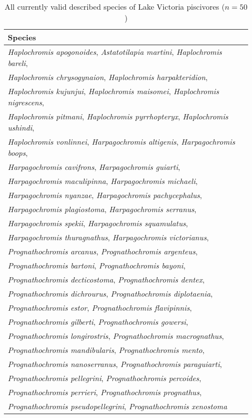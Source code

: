\begin{table}[]
\centering
\begin{tabular}{l}
\toprule 
\textbf{Species} \\ \midrule
\textit{Haplochromis apogonoides}, \textit{Astatotilapia martini}, \textit{Haplochromis bareli}, \\
\textit{Haplochromis chrysogynaion}, \textit{Haplochromis harpakteridion}, \\
\textit{Haplochromis kujunjui}, \textit{Haplochromis maisomei}, \textit{Haplochromis nigrescens}, \\
\textit{Haplochromis pitmani}, \textit{Haplochromis pyrrhopteryx}, \textit{Haplochromis ushindi}, \\
\textit{Haplochromis vonlinnei}, \textit{Harpagochromis altigenis}, \textit{Harpagochromis boops}, \\
\textit{Harpagochromis cavifrons}, \textit{Harpagochromis guiarti}, \\
\textit{Harpagochromis maculipinna}, \textit{Harpagochromis michaeli}, \\
\textit{Harpagochromis nyanzae}, \textit{Harpagochromis pachycephalus}, \\
\textit{Harpagochromis plagiostoma}, \textit{Harpagochromis serranus}, \\
\textit{Harpagochromis spekii}, \textit{Harpagochromis squamulatus}, \\
\textit{Harpagochromis thuragnathus}, \textit{Harpagochromis victorianus}, \\
\textit{Prognathochromis arcanus}, \textit{Prognathochromis argenteus}, \\
\textit{Prognathochromis bartoni}, \textit{Prognathochromis bayoni}, \\
\textit{Prognathochromis decticostoma}, \textit{Prognathochromis dentex}, \\
\textit{Prognathochromis dichrourus}, \textit{Prognathochromis diplotaenia}, \\
\textit{Prognathochromis estor}, \textit{Prognathochromis flavipinnis}, \\
\textit{Prognathochromis gilberti}, \textit{Prognathochromis gowersi}, \\
\textit{Prognathochromis longirostris}, \textit{Prognathochromis macrognathus}, \\
\textit{Prognathochromis mandibularis}, \textit{Prognathochromis mento}, \\
\textit{Prognathochromis nanoserranus}, \textit{Prognathochromis paraguiarti}, \\
\textit{Prognathochromis pellegrini}, \textit{Prognathochromis percoides}, \\
\textit{Prognathochromis perrieri}, \textit{Prognathochromis prognathus}, \\
\textit{Prognathochromis pseudopellegrini}, \textit{Prognathochromis xenostoma}  \\ \bottomrule
\end{tabular}
\caption{All currently valid described species of Lake Victoria piscivores ($n=50$)}
\label{FJ_table4}
\end{table}